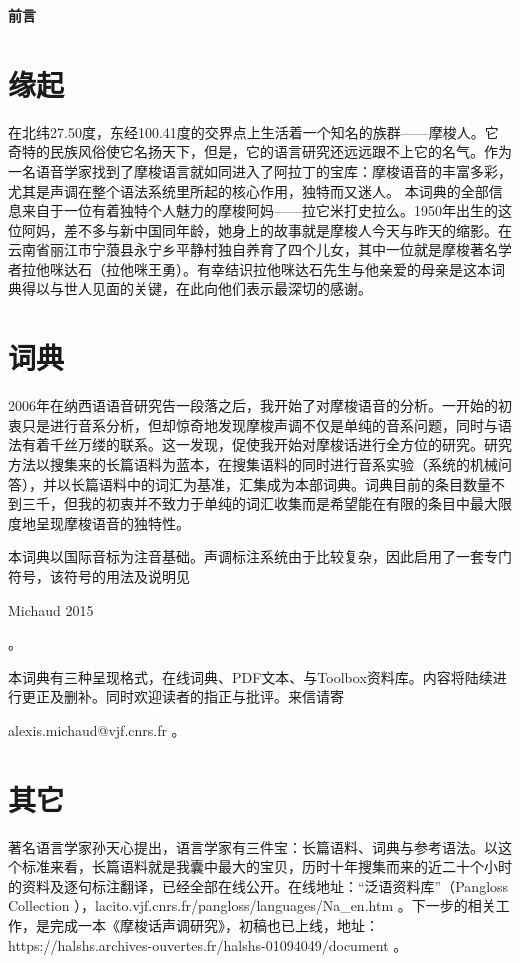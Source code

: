 \documentclass[oldfontcommands,oneside,a4paper,11pt]{article}
\newcommand{\zh}[1]{{\cn #1}}
\begin{document}
	\clearpage
	
	
	{\LARGE \textbf{\zh{前言}}}
	\section{ \zh{缘起}} \label{sec:language}
	
	\zh{ 在北纬27.50度，东经100.41度的交界点上生活着一个知名的族群——摩梭人。它奇特的民族风俗使它名扬天下，但是，它的语言研究还远远跟不上它的名气。作为一名语音学家找到了摩梭语言就如同进入了阿拉丁的宝库：摩梭语音的丰富多彩，尤其是声调在整个语法系统里所起的核心作用，独特而又迷人。
		本词典的全部信息来自于一位有着独特个人魅力的摩梭阿妈——拉它米打史拉么。1950年出生的这位阿妈，差不多与新中国同年龄，她身上的故事就是摩梭人今天与昨天的缩影。在云南省丽江市宁蒗县永宁乡平静村独自养育了四个儿女，其中一位就是摩梭著名学者拉他咪达石（拉他咪王勇）。有幸结识拉他咪达石先生与他亲爱的母亲是这本词典得以与世人见面的关键，在此向他们表示最深切的感谢。}
	
	\section{ \zh{词典}} \label{sec:method}
	
	\zh{2006年在纳西语语音研究告一段落之后，我开始了对摩梭语音的分析。一开始的初衷只是进行音系分析，但却惊奇地发现摩梭声调不仅是单纯的音系问题，同时与语法有着千丝万缕的联系。这一发现，促使我开始对摩梭话进行全方位的研究。研究方法以搜集来的长篇语料为蓝本，在搜集语料的同时进行音系实验（系统的机械问答），并以长篇语料中的词汇为基准，汇集成为本部词典。词典目前的条目数量不到三千，但我的初衷并不致力于单纯的词汇收集而是希望能在有限的条目中最大限度地呈现摩梭语音的独特性。
		
		本词典以国际音标为注音基础。声调标注系统由于比较复杂，因此启用了一套专门符号，该符号的用法及说明见}Michaud 2015\zh{。
		
		本词典有三种呈现格式，在线词典、PDF文本、与Toolbox资料库。内容将陆续进行更正及删补。同时欢迎读者的指正与批评。来信请寄}alexis.michaud@vjf.cnrs.fr \zh{。}
	
	\section{ \zh{其它}} \label{sec:other}
	
	\zh{著名语言学家孙天心提出，语言学家有三件宝：长篇语料、词典与参考语法。以这个标准来看，长篇语料就是我囊中最大的宝贝，历时十年搜集而来的近二十个小时的资料及逐句标注翻译，已经全部在线公开。在线地址：“泛语资料库”（}Pangloss Collection \zh{），}lacito.vjf.cnrs.fr/pangloss/languages/Na\_en.htm \zh{。下一步的相关工作，是完成一本《摩梭话声调研究》，初稿也已上线，地址：}https://halshs.archives-ouvertes.fr/halshs-01094049/document \zh{。}
	
\end{document}
